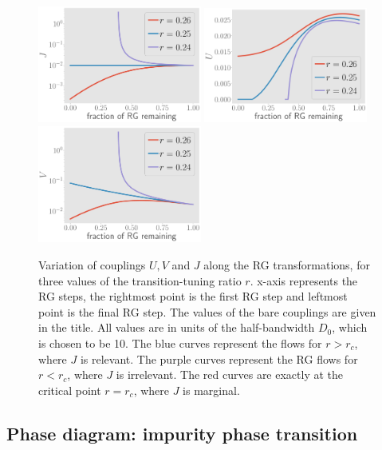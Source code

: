 \documentclass[reprint,superscriptaddress,floatfix]{revtex4-2}
\begin{document}
\begin{figure}[!htb]
	\centering
	\includegraphics[width=0.48\textwidth]{../figures/J_Ub.pdf}
	\includegraphics[width=0.48\textwidth]{../figures/U_Ub.pdf}
	\includegraphics[width=0.48\textwidth]{../figures/V_Ub.pdf}
	\caption{Variation of couplings \(U,V\) and \(J\) along the RG transformations, for three values of the transition-tuning ratio \(r\). x-axis represents the RG steps, the rightmost point is the first RG step and leftmost point is the final RG step. The values of the bare couplings are given in the title. All values are in units of the half-bandwidth \(D_0\), which is chosen to be 10. The blue curves represent the flows for \(r > r_c\), where \(J\) is relevant. The purple curves represent the RG flows for \(r < r_c\), where \(J\) is irrelevant. The red curves are exactly at the critical point \(r = r_c\), where \(J\) is marginal.}
	\label{rg-flow}
\end{figure}

\subsection{Phase diagram: impurity phase transition}
\end{document}
